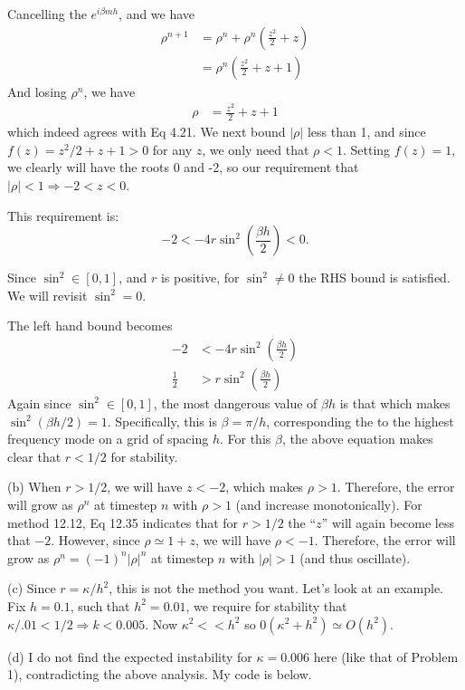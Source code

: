 \documentclass[11pt]{article}
\def\f{\frac }
\begin{document}
\begin{enumerate}
Cancelling the $e^{i \beta m h}$, and we have
\begin{align*} \rho ^{n+1} &= \rho ^n + \rho ^n \left (\f{z^2}{2} + z \right )\\
&= \rho^n \left (\f{z^2}{2} + z + 1\right )\end{align*}
And losing $\rho ^n$, we have
\begin{align*} \rho &= \f{z^2}{2} + z + 1\end{align*}
which indeed agrees with Eq 4.21.
We next bound $|\rho|$ less than 1, and since $f(z) = z^2/2 + z + 1 > 0$ for any $z$, we only need that $\rho < 1$.
Setting $f(z) = 1$, we clearly will have the roots 0 and -2, so our requirement that $|\rho| < 1 \Rightarrow -2<z<0$.

This requirement is:
\[ -2 < -4 r \sin ^2 \left (\f{\beta h}{2} \right ) < 0.\]

Since $\sin ^2 \in [0,1]$, and $r$ is positive, for $\sin ^2 \ne 0$ the RHS bound is satisfied.
We will revisit $\sin ^2 = 0$.

The left hand bound becomes
\begin{align*} -2 &< -4 r \sin ^2 \left (\f{\beta h}{2} \right )\\
\f{1}{2} &>  r \sin ^2 \left (\f{\beta h}{2} \right )\end{align*}
Again since $\sin ^2 \in [0,1]$, the most dangerous value of $\beta h$ is that which makes $\sin ^2 (\beta h /2) = 1$.
Specifically, this is $\beta = \pi / h$, corresponding the to the highest frequency mode on a grid of spacing $h$.
For this $\beta$, the above equation makes clear that $r < 1/2$ for stability.

(b) When $r > 1/2$, we will have $z < -2$, which makes $\rho > 1$.
Therefore, the error will grow as $\rho ^n$ at timestep $n$ with $\rho > 1$ (and increase monotonically).
For method 12.12, Eq 12.35 indicates that for $r > 1/2$ the ``$z$'' will again become less that $-2$.
However, since $\rho \simeq 1+z$, we will have $\rho < -1$.
Therefore, the error will grow as $\rho ^n = (-1)^n |\rho | ^n$ at timestep $n$ with $|\rho | > 1$ (and thus oscillate).

(c) Since $r = \kappa / h^2$, this is not the method you want.
Let's look at an example.
Fix $h = 0.1$, such that $h^2 = 0.01$, we require for stability that $\kappa / .01 < 1/2 \Rightarrow k < 0.005$.
Now $\kappa ^2 << h^2$ so $0(\kappa ^2 + h^2 ) \simeq O(h^2)$.

(d) I do not find the expected instability for $\kappa = 0.006$ here (like that of Problem 1), contradicting the above analysis.
My code is below.


\end{enumerate}
\end{document}
